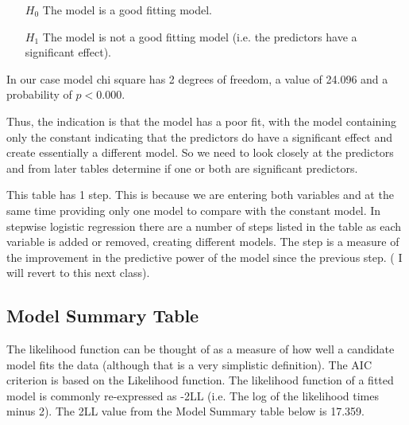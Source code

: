 \documentclass[a4paper,12pt]{article}
\begin{document}
 \begin{itemize}
 \item[$H_0$] The model is a good fitting model.
 \item[$H_1$] The model is not a good fitting model (i.e. the predictors have a significant effect).
 \end{itemize}
 In our case model chi square has 2 degrees of freedom, a value of 24.096 and a probability of $p < 0.000$.

Thus, the indication is that the model has a poor fit, with the model containing only the constant indicating that the predictors do have a significant effect and create essentially a different model. So we need to look closely at
the predictors and from later tables determine if one or both are significant predictors.

This table has 1 step. This is because we are entering both variables and at the same
time providing only one model to compare with the constant model. In stepwise logistic regression there are a number of steps listed in the table as each variable is added or
removed, creating different models. The step is a measure of the improvement in the
predictive power of the model since the previous step. ( I will revert to this next class).




\subsection{Model Summary Table}


The likelihood function can be thought of as a measure of how well a candidate model fits the data (although that is a very simplistic definition). The AIC criterion is based on the Likelihood function.
The likelihood function of a fitted model is commonly re-expressed as -2LL (i.e. The log of the likelihood times minus 2). The 2LL value from the Model Summary table below is 17.359.
\end{document}
